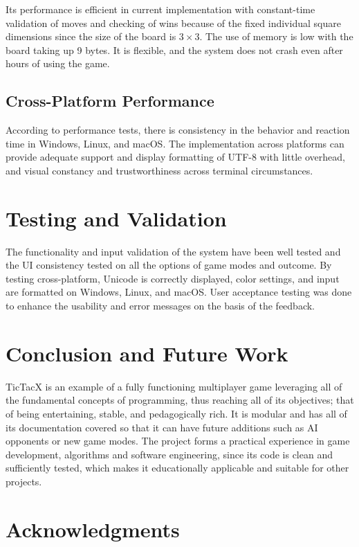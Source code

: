 \documentclass[11pt,a4paper,twocolumn]{article}
\begin{document}
Its performance is efficient in current implementation with constant-time validation of moves and checking of wins because of the fixed individual square dimensions since the size of the board is $3 \times 3$. The use of memory is low with the board taking up 9 bytes. It is flexible, and the system does not crash even after hours of using the game.

\subsection{Cross-Platform Performance}

According to performance tests, there is consistency in the behavior and reaction time in Windows, Linux, and macOS. The implementation across platforms can provide adequate support and display formatting of UTF-8 with little overhead, and visual constancy and trustworthiness across terminal circumstances.

\section{Testing and Validation}

The functionality and input validation of the system have been well tested and the UI consistency tested on all the options of game modes and outcome. By testing cross-platform, Unicode is correctly displayed, color settings, and input are formatted on Windows, Linux, and macOS. User acceptance testing was done to enhance the usability and error messages on the basis of the feedback.

\section{Conclusion and Future Work}

TicTacX is an example of a fully functioning multiplayer game leveraging all of the fundamental concepts of programming, thus reaching all of its objectives; that of being entertaining, stable, and pedagogically rich. It is modular and has all of its documentation covered so that it can have future additions such as AI opponents or new game modes. The project forms a practical experience in game development, algorithms and software engineering, since its code is clean and sufficiently tested, which makes it educationally applicable and suitable for other projects.

\section{Acknowledgments}
\end{document}
